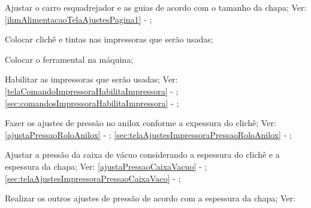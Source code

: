 \begin{procedureAdjustmentNoRecipe}
  \item[\ding{\dingNumber}] Ajustar o carro esquadrejador e as guias de acordo com o tamanho da chapa; Ver: \ref{ihmAlimentacaoTelaAjustesPagina1} - ;
  \item[\ding{\dingNumber}] Colocar clichê e tintas nas impressoras que serão usadas;
  \item[\ding{\dingNumber}] Colocar o ferramental na máquina;
  \item[\ding{\dingNumber}] Habilitar as impressoras que serão usadas; Ver: 
  \ifmachineTypeFlexo
  \ref{telaComandoImpressoraHabilitaImpressora} - ;
  \fi
  \ifmachineTypeIcv
  \ref{sec:comandosImpressoraHabilitaImpressora} - ;
  \fi
  \item[\ding{\dingNumber}] Fazer os ajustes de pressão no anilox conforme a expessura do clichê; Ver: 
  \ifmachineTypeFlexo
  \ref{ajustaPressaoRoloAnilox} - ;
  \fi
  \ifmachineTypeIcv
  \ref{sec:telaAjustesImpressoraPressaoRoloAnilox} - ;
  \fi
  \item[\ding{\dingNumber}] Ajustar a pressão da caixa de vácuo considerando a espessura do clichê e a espessura da chapa; Ver: 
  \ifmachineTypeFlexo
  \ref{ajustaPressaoCaixaVacuo} - ;
  \fi
  \ifmachineTypeIcv
  \ref{sec:telaAjustesImpressoraPressaoCaixaVaco} - ;
  \fi
  \item[\ding{\dingNumber}] Realizar os outros ajustes de pressão de acordo com a espessura da chapa; Ver: 

    \begin{pressureAdjustment}
      \ifmachineTypeFlexo


\end{pressureAdjustment}
\end{procedureAdjustmentNoRecipe}

